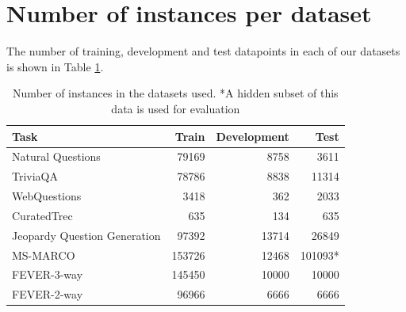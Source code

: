 \section{Number of instances per dataset}

The number of training, development and test datapoints in each of our datasets is shown in Table \ref{tab:num_instances}.
\begin{table}

    \centering
    \small
        \caption{Number of instances in the datasets used. *A hidden subset of this data is used for evaluation }
        \vspace{5pt}
     
    \begin{tabular}{lrrr}
    \toprule
    Task & Train & Development & Test\\ \midrule
    Natural Questions & 79169 & 8758 & 3611\\
    TriviaQA & 78786 & 8838 & 11314\\
    WebQuestions & 3418 & 362 & 2033\\
    CuratedTrec & 635 & 134 & 635\\
    Jeopardy Question Generation & 97392 & 13714 & 26849\\
    MS-MARCO & 153726 & 12468 & 101093*\\
    FEVER-3-way & 145450 & 10000 & 10000\\
    FEVER-2-way & 96966 & 6666 & 6666\\

    \bottomrule
    \end{tabular}
    \label{tab:num_instances}
\end{table}